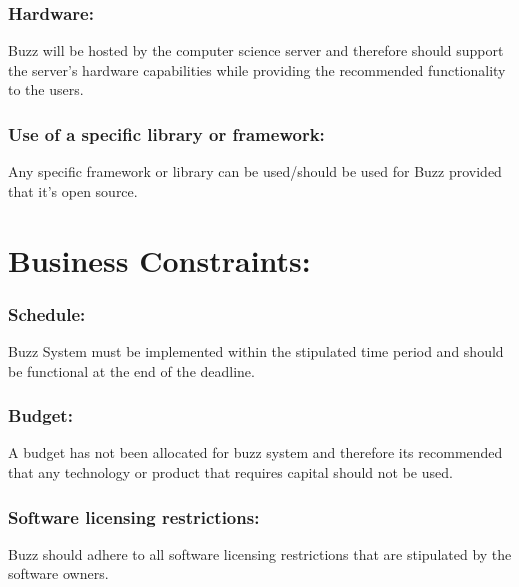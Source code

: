 \documentclass[11pt]{article}
\begin{document}
			\subsubsection{Hardware:}
			
			
			\textbf{}Buzz will be hosted by the computer science server and therefore should support the server’s hardware capabilities while providing the recommended functionality to the users.
			
			\subsubsection{Use of a specific library or framework:}
			
			
			\textbf{}Any specific framework or library can be used/should be used for Buzz provided that it’s open source.
	
			\section{ Business Constraints:}
				\subsubsection{Schedule:}
				
				
				\textbf{}Buzz System must be implemented within the stipulated time period and should be functional at the end of the deadline.
					\subsubsection{Budget:}
					
					
					\textbf{}A budget has not been allocated for buzz system and therefore its recommended that any technology or product that requires capital should not be used.
						\subsubsection{Software licensing restrictions:}
						
						
						\textbf{}Buzz should adhere to all software licensing restrictions that are stipulated by the software owners.
\end{document}
